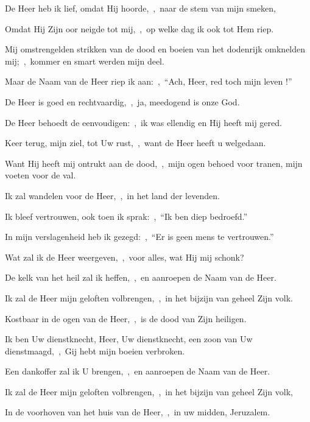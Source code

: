 \documentclass[12pt,twoside,a5paper]{article}
\begin{document}

\begin{halfparskip}
   De Heer heb ik lief, omdat Hij hoorde,~\sep\ naar de stem van mijn smeken,

  Omdat Hij Zijn oor neigde tot mij,~\sep\ op welke dag ik ook tot Hem riep.


  Mij omstrengelden strikken van de dood en boeien van het dodenrijk omknelden mij;~\sep\ kommer en smart werden mijn deel.

  Maar de Naam van de Heer riep ik aan:~\sep\ ``Ach, Heer, red toch mijn leven !''

  De Heer is goed en rechtvaardig,~\sep\ ja, meedogend is onze God.

  De Heer behoedt de eenvoudigen:~\sep\ ik was ellendig en Hij heeft mij gered.

  Keer terug, mijn ziel, tot Uw rust,~\sep\ want de Heer heeft u welgedaan.

  Want Hij heeft mij ontrukt aan de dood,~\sep\ mijn ogen behoed voor tranen, mijn voeten voor de val.

  Ik zal wandelen voor de Heer,~\sep\ in het land der levenden.

  Ik bleef vertrouwen, ook toen ik sprak:~\sep\ ``Ik ben diep bedroefd.''

  In mijn verslagenheid heb ik gezegd:~\sep\ ``Er is geen mens te vertrouwen.''

  Wat zal ik de Heer weergeven,~\sep\ voor alles, wat Hij mij schonk?

  De kelk van het heil zal ik heffen,~\sep\ en aanroepen de Naam van de Heer.

  Ik zal de Heer mijn geloften volbrengen,~\sep\ in het bijzijn van geheel Zijn volk.

  Kostbaar in de ogen van de Heer,~\sep\ is de dood van Zijn heiligen.

  Ik ben Uw dienstknecht, Heer, Uw dienstknecht, een zoon van Uw dienstmaagd,~\sep\ Gij hebt mijn boeien verbroken.

  Een dankoffer zal ik U brengen,~\sep\ en aanroepen de Naam van de Heer.

  Ik zal de Heer mijn geloften volbrengen,~\sep\ in het bijzijn van geheel Zijn volk,

  In de voorhoven van het huis van de Heer,~\sep\ in uw midden, Jeruzalem.


\end{halfparskip}
\end{document}
